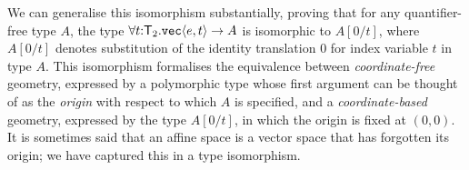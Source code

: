 We can generalise this isomorphism substantially, proving
that for any quantifier-free type $A$, 
the type $\forall t\mathord:\mathsf{T}_2.\textup{\texttt{vec}}\langle e,t \rangle\to A$
is isomorphic to $A[0/t]$, where $A[0/t]$ 
denotes substitution of the identity translation $0$
for index variable $t$ in type $A$. This isomorphism formalises the
equivalence between \emph{coordinate-free} geometry, expressed by a
polymorphic type whose first argument can be thought of as the
\emph{origin} with respect to which $A$ is specified, and a
\emph{coordinate-based} geometry, expressed by the type $A[0/t]$, in
which the origin is fixed at $(0,0)$. It is sometimes said that an
affine space is a vector space that has forgotten its origin; we have
captured this in a type isomorphism.

\newcommand{\transup}[3]{\mathord\uparrow_{#1}^{#2\mathord:#3}}
\newcommand{\transdn}[3]{\mathord\downarrow_{#1}^{#2\mathord:#3}}

